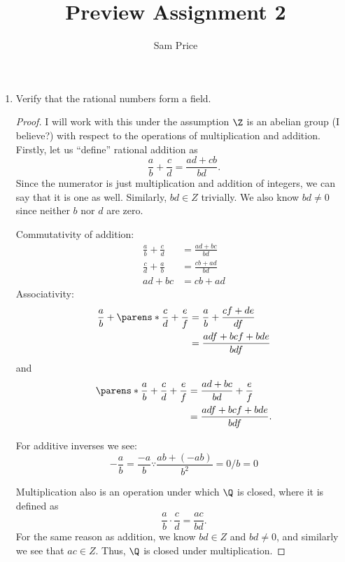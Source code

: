 \documentclass{article}
\author{Sam Price}
\date{}
\title{Preview Assignment 2}
\begin{document}
\maketitle

\begin{enumerate}

  \item Verify that the rational numbers form a field.
        \begin{proof}
          I will work with this under the assumption $\Z$ is an abelian group (I believe?) with respect
          to the operations of multiplication and addition.
          Firstly, let us ``define'' rational addition as
          \begin{equation}\label{eq:rational-addition}
            \frac{a}{b} + \frac{c}{d} = \frac{ad + cb}{bd}.
          \end{equation}
          Since the numerator is just multiplication and addition of integers, we can say that it is one as well.
          Similarly, $bd \in Z$ trivially. We also know $bd \ne 0$ since neither $b$ nor $d$ are zero.

          Commutativity of addition:
          \begin{align*}
            \frac{a}{b} + \frac{c}{d} &= \frac{ad + bc}{bd}\\
            \frac{c}{d} + \frac{a}{b} &= \frac{cb + ad}{bd}\\
            ad + bc &= cb + ad
          \end{align*}
          Associativity:
          \begin{align*}
            \frac{a}{b} + \parens*{\frac{c}{d} + \frac{e}{f}} &= \frac{a}{b} + \frac{cf + de}{df}\\
            &= \frac{adf + bcf + bde}{bdf}
          \end{align*}
          and
          \begin{align*}
            \parens*{\frac{a}{b} + \frac{c}{d}} + \frac{e}{f} &= \frac{ad + bc}{bd} + \frac{e}{f}\\
            &= \frac{adf + bcf + bde}{bdf}.
          \end{align*}

          For additive inverses we see:
          \begin{equation*}
            -\frac{a}{b} = \frac{-a}{b} \because \frac{ab + (-ab)}{b^{2}} = 0/b = 0
          \end{equation*}

          Multiplication also is an operation under which $\Q$ is closed, where it is defined as
          \begin{equation}\label{eq:rational-multiplication}
            \frac{a}{b} \cdot \frac{c}{d} = \frac{ac}{bd}.
          \end{equation}
          For the same reason as addition, we know $bd \in Z$ and $bd \ne 0$, and similarly we see that $ac \in Z$.
          Thus, $\Q$ is closed under multiplication.


\end{proof}
\end{enumerate}
\end{document}
